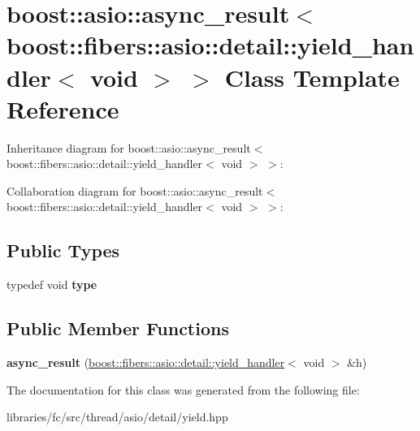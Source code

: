 \hypertarget{classboost_1_1asio_1_1async__result_3_01boost_1_1fibers_1_1asio_1_1detail_1_1yield__handler_3_01void_01_4_01_4}{}\section{boost\+:\+:asio\+:\+:async\+\_\+result$<$ boost\+:\+:fibers\+:\+:asio\+:\+:detail\+:\+:yield\+\_\+handler$<$ void $>$ $>$ Class Template Reference}
\label{classboost_1_1asio_1_1async__result_3_01boost_1_1fibers_1_1asio_1_1detail_1_1yield__handler_3_01void_01_4_01_4}


Inheritance diagram for boost\+:\+:asio\+:\+:async\+\_\+result$<$ boost\+:\+:fibers\+:\+:asio\+:\+:detail\+:\+:yield\+\_\+handler$<$ void $>$ $>$\+:


Collaboration diagram for boost\+:\+:asio\+:\+:async\+\_\+result$<$ boost\+:\+:fibers\+:\+:asio\+:\+:detail\+:\+:yield\+\_\+handler$<$ void $>$ $>$\+:
\subsection*{Public Types}
\begin{DoxyCompactItemize}
\item 
\mbox{\label{classboost_1_1asio_1_1async__result_3_01boost_1_1fibers_1_1asio_1_1detail_1_1yield__handler_3_01void_01_4_01_4_ab42bc4b4a3731009cf30592e32d7f50e}} 
typedef void {\bfseries type}
\end{DoxyCompactItemize}
\subsection*{Public Member Functions}
\begin{DoxyCompactItemize}
\item 
\mbox{\label{classboost_1_1asio_1_1async__result_3_01boost_1_1fibers_1_1asio_1_1detail_1_1yield__handler_3_01void_01_4_01_4_a1d0ee4594c562f6954c7bca460201588}} 
{\bfseries async\+\_\+result} (\mbox{\hyperlink{classboost_1_1fibers_1_1asio_1_1detail_1_1yield__handler}{boost\+::fibers\+::asio\+::detail\+::yield\+\_\+handler}}$<$ void $>$ \&h)
\end{DoxyCompactItemize}


The documentation for this class was generated from the following file\+:\begin{DoxyCompactItemize}
\item 
libraries/fc/src/thread/asio/detail/yield.\+hpp\end{DoxyCompactItemize}
